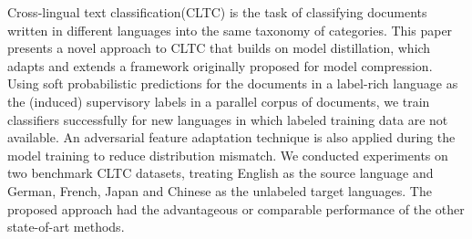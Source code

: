 Cross-lingual text classification(CLTC) is the task of classifying documents written in different languages into the same taxonomy of categories. This paper presents a novel approach to CLTC that builds on model distillation, which adapts and extends a framework originally proposed for model compression. Using soft probabilistic predictions for the documents in a label-rich language as the (induced) supervisory labels in a parallel corpus of documents, we train classifiers successfully for new languages in which labeled training data are not available. An adversarial feature adaptation technique is also applied during the model training to reduce distribution mismatch. We conducted experiments on two benchmark CLTC datasets, treating English as the source language and German, French, Japan and Chinese as the unlabeled target languages. The proposed approach had the advantageous or comparable performance of the other state-of-art methods.
